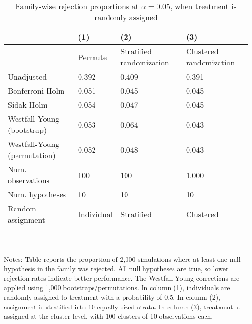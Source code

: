 \documentclass{article}
\begin{document}
\begin{table}[tbp] \centering
{}

\caption{Family-wise rejection proportions at \(\alpha = 0.05\), when treatment is randomly assigned}
\label{tab:wyoung4}
\begin{tabularx}{\linewidth}{@{}lCCC@{}}

\toprule
&{(1)}&{(2)}&{(3)} \tabularnewline \midrule
{}&{Permute}&{Stratified randomization}&{Clustered randomization} \tabularnewline
\midrule \addlinespace[\belowrulesep]
Unadjusted&0.392&0.409&0.391 \tabularnewline
Bonferroni-Holm&0.051&0.045&0.045 \tabularnewline
Sidak-Holm&0.054&0.047&0.045 \tabularnewline
Westfall-Young (bootstrap)&0.053&0.064&0.043 \tabularnewline
\midrule Westfall-Young (permutation)&0.052&0.048&0.043 \tabularnewline
Num. observations&100&100&1,000 \tabularnewline
Num. hypotheses&10&10&10 \tabularnewline
Random assignment&Individual&Stratified&Clustered \tabularnewline
\bottomrule \addlinespace[\belowrulesep]

\end{tabularx}
\\ \parbox{\linewidth}{\footnotesize Notes: Table reports the proportion of 2,000 simulations where at least one null hypothesis in the family was rejected. All null hypotheses are true, so lower rejection rates indicate better performance. The Westfall-Young corrections are applied using 1,000 bootstraps/permutations. In column (1), individuals are randomly assigned to treatment with a probability of 0.5. In column (2), assignment is stratified into 10 equally sized strata. In column (3), treatment is assigned at the cluster level, with 100 clusters of 10 observations each.}
\end{table}
\end{document}
